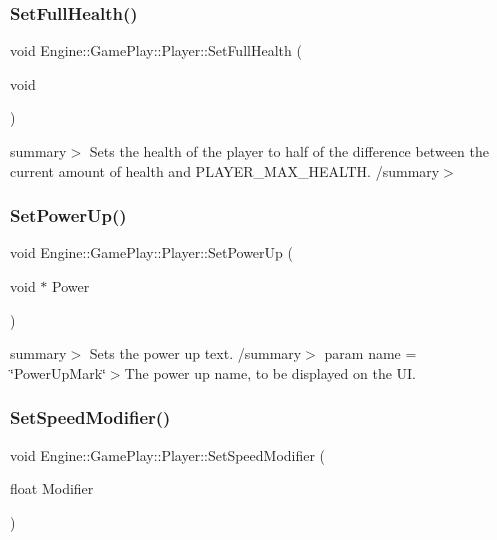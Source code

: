 \subsubsection{\texorpdfstring{Set\+Full\+Health()}{SetFullHealth()}}
{\footnotesize\ttfamily void Engine\+::\+Game\+Play\+::\+Player\+::\+Set\+Full\+Health (\begin{DoxyParamCaption}\item[{void}]{ }\end{DoxyParamCaption})}

summary$>$ Sets the health of the player to half of the difference between the current amount of health and P\+L\+A\+Y\+E\+R\+\_\+\+M\+A\+X\+\_\+\+H\+E\+A\+L\+TH. /summary$>$ \mbox{\label{class_engine_1_1_game_play_1_1_player_aa592871c49210d80e1cda615e0dee15d}} 
\subsubsection{\texorpdfstring{Set\+Power\+Up()}{SetPowerUp()}}
{\footnotesize\ttfamily void Engine\+::\+Game\+Play\+::\+Player\+::\+Set\+Power\+Up (\begin{DoxyParamCaption}\item[{void $\ast$}]{Power }\end{DoxyParamCaption})}

summary$>$ Sets the power up text. /summary$>$ param name = \char`\"{}\+Power\+Up\+Mark\char`\"{}$>$The power up name, to be displayed on the UI.\mbox{\label{class_engine_1_1_game_play_1_1_player_a5a67ed64c644e9ebea338feb0db0ac98}} 
\subsubsection{\texorpdfstring{Set\+Speed\+Modifier()}{SetSpeedModifier()}}
{\footnotesize\ttfamily void Engine\+::\+Game\+Play\+::\+Player\+::\+Set\+Speed\+Modifier (\begin{DoxyParamCaption}\item[{float}]{Modifier }\end{DoxyParamCaption})}

